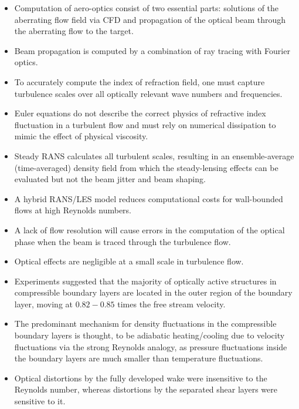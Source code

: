 \begin{itemize}
            \item Computation of aero-optics consist of two essential parts: solutions of the aberrating flow field via CFD and propagation of the optical beam through the aberrating flow to the target. 
            \item Beam propagation is computed by a combination of ray tracing with Fourier optics.
            \item To accurately compute the index of refraction field, one must capture turbulence scales over all optically relevant wave numbers and frequencies. 
            \item Euler equations do not describe the correct physics of refractive index fluctuation in a turbulent flow and must rely on numerical dissipation to mimic the effect of physical viscosity. 
            \item Steady RANS calculates all turbulent scales, resulting in an ensemble-average (time-averaged) density field from which the steady-lensing effects can be evaluated but not the beam jitter and beam shaping.      
            \item A hybrid RANS/LES model reduces computational costs for wall-bounded flows at high Reynolds numbers.
            \item A lack of flow resolution will cause errors in the computation of the optical phase when the beam is traced through the turbulence flow.
            \item Optical effects are negligible at a small scale in turbulence flow. 
            \item Experiments suggested that the majority of optically active structures in compressible boundary layers are located in the outer region of the boundary layer, moving at $0.82 - 0.85$ times the free stream velocity.  
            \item The predominant mechanism for density fluctuations in the compressible boundary layers is thought, to be adiabatic heating/cooling due to velocity fluctuations via the strong Reynolds analogy, as pressure fluctuations inside the boundary layers are much smaller than temperature fluctuations. 
            \item Optical distortions by the fully developed wake were insensitive to the Reynolds number, whereas distortions by the separated shear layers were sensitive to it.
        \end{itemize}


